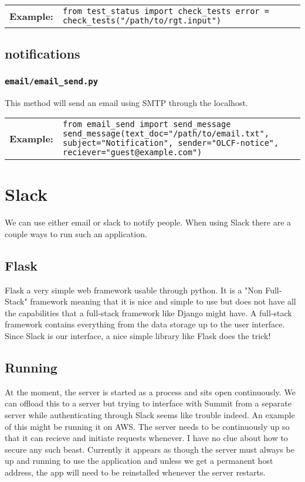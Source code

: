 \documentclass{article}
\newcommand{\example}[1]{
\begin{tabular}{ l p{\textwidth} }
	\textbf{Example:} & \texttt{#1}
\end{tabular}
}
\newcommand{\un}[0]{\_}
\begin{document}
\example{from test\un status import check\un tests \newline
		 error = check\un tests("/path/to/rgt.input")}

\subsection{notifications}

\subsubsection{\texttt{email/email\un send.py}}

This method will send an email using SMTP through the localhost.

\example{from email\un send import send\un message \newline
		 send\un message(text\un doc="/path/to/email.txt", \newline
		 subject="Notification", sender="OLCF-notice", \newline
		 reciever="guest\makeatletter @\makeatother example.com")}

\section{Slack}

We can use either email or slack to notify people. When using Slack there are a couple ways to run such an application.

\subsection{Flask}

Flask a very simple web framework usable through python. It is a "Non Full-Stack" framework meaning that it is nice and simple to use but does not have all the capabilities that a full-stack framework like Django might have. A full-stack framework contains everything from the data storage up to the user interface. Since Slack is our interface, a nice simple library like Flask does the trick!

\subsection{Running}

At the moment, the server is started as a process and sits open continuously. We can offload this to a server but trying to interface with Summit from a separate server while authenticating through Slack seems like trouble indeed. An example of this might be running it on AWS. The server needs to be continuously up so that it can recieve and initiate requests whenever. I have no clue about how to secure any such beast. Currently it appears as though the server must always be up and running to use the application and unless we get a permanent host address, the app will need to be reinstalled whenever the server restarts.
\end{document}
